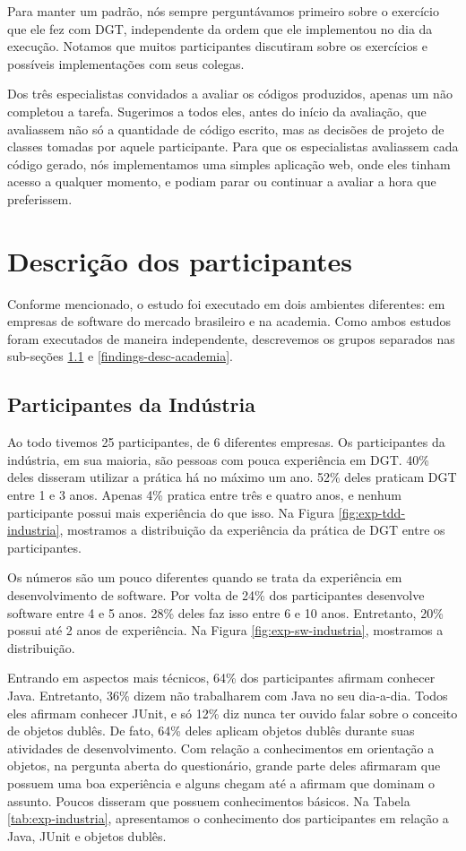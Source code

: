 Para manter um padrão, nós sempre perguntávamos primeiro sobre o exercício que ele
fez com DGT, independente da ordem que ele implementou no dia da execução. Notamos
que muitos participantes discutiram sobre os exercícios e possíveis implementações com seus colegas.

Dos três especialistas convidados a avaliar os códigos produzidos, apenas um não
completou a tarefa. Sugerimos a todos eles, antes do início da avaliação, que avaliassem
não só a quantidade de código escrito, mas as decisões de projeto de classes tomadas por aquele
participante. Para que os especialistas avaliassem cada código gerado, nós implementamos
uma simples aplicação web, onde eles tinham acesso a qualquer momento, e podiam parar ou continuar
a avaliar a hora que preferissem.

\section{Descrição dos participantes}

Conforme mencionado, o estudo foi executado em dois ambientes diferentes: em empresas de software
do mercado brasileiro e na academia. Como ambos estudos foram executados de maneira independente,
descrevemos os grupos separados nas sub-seções \ref{findings-desc-industria} e \ref{findings-desc-academia}.

\subsection{Participantes da Indústria}
\label{findings-desc-industria}

Ao todo tivemos 25 participantes, de 6 diferentes empresas.
Os participantes da indústria, em sua maioria, são pessoas com pouca experiência em DGT.
40\% deles disseram utilizar a prática há no máximo um ano. 52\% deles praticam DGT
entre 1 e 3 anos. Apenas 4\% pratica entre três e quatro anos, e nenhum participante
possui mais experiência do que isso. Na Figura \ref{fig:exp-tdd-industria}, mostramos
a distribuição da experiência da prática de DGT entre os participantes.

Os números são um pouco diferentes quando se trata da experiência em desenvolvimento
de software. Por volta de 24\% dos participantes desenvolve software entre 4 e 5 anos.
28\% deles faz isso entre 6 e 10 anos. Entretanto, 20\% possui até 2 anos de experiência.
Na Figura \ref{fig:exp-sw-industria}, mostramos a distribuição.

Entrando em aspectos mais técnicos, 64\% dos participantes afirmam conhecer Java. Entretanto,
36\% dizem não trabalharem com Java no seu dia-a-dia. Todos eles afirmam conhecer JUnit,
e só 12\% diz nunca ter ouvido falar sobre o conceito de objetos dublês. De fato, 64\% deles
aplicam objetos dublês durante suas atividades de desenvolvimento. Com relação a conhecimentos
em orientação a objetos, na pergunta aberta do questionário, grande parte deles 
afirmaram que possuem uma boa experiência e alguns
chegam até a afirmam que dominam o assunto. Poucos disseram que possuem conhecimentos
básicos. Na Tabela \ref{tab:exp-industria},
apresentamos o conhecimento dos participantes em relação a Java, JUnit e objetos dublês.

